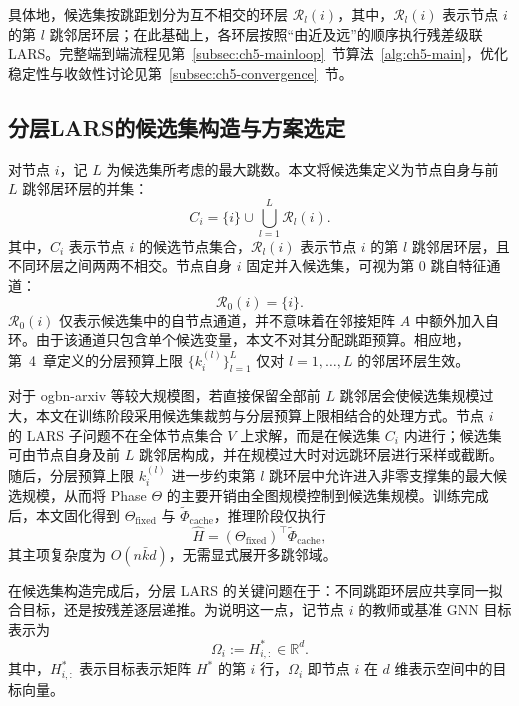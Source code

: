 具体地，候选集按跳距划分为互不相交的环层 $\mathcal{R}_l(i)$，其中，$\mathcal{R}_l(i)$ 表示节点 $i$ 的第 $l$ 跳邻居环层；在此基础上，各环层按照“由近及远”的顺序执行残差级联 LARS。完整端到端流程见第~\ref{subsec:ch5-mainloop}~节算法~\ref{alg:ch5-main}，优化稳定性与收敛性讨论见第~\ref{subsec:ch5-convergence}~节。

\subsection{分层LARS的候选集构造与方案选定}
\label{subsec:ch5-candidateset}

对节点 \(i\)，记 \(L\) 为候选集所考虑的最大跳数。本文将候选集定义为节点自身与前 \(L\) 跳邻居环层的并集：
\begin{equation}
  C_i=\{i\}\cup\bigcup_{l=1}^{L}\mathcal{R}_l(i).
  \label{eq:ch5-candidate-set}
\end{equation}
其中，\(C_i\) 表示节点 \(i\) 的候选节点集合，\(\mathcal{R}_l(i)\) 表示节点 \(i\) 的第 \(l\) 跳邻居环层，且不同环层之间两两不相交。节点自身 \(i\) 固定并入候选集，可视为第 \(0\) 跳自特征通道：
\begin{equation}
  \mathcal{R}_0(i)=\{i\}.
  \label{eq:ch5-self-ring}
\end{equation}
\(\mathcal{R}_0(i)\) 仅表示候选集中的自节点通道，并不意味着在邻接矩阵 \(A\) 中额外加入自环。由于该通道只包含单个候选变量，本文不对其分配跳距预算。相应地，第~4~章定义的分层预算上限 \(\{k_i^{(l)}\}_{l=1}^{L}\) 仅对 \(l=1,\ldots,L\) 的邻居环层生效。

对于 ogbn-arxiv 等较大规模图，若直接保留全部前 \(L\) 跳邻居会使候选集规模过大，本文在训练阶段采用候选集裁剪与分层预算上限相结合的处理方式。节点 \(i\) 的 LARS 子问题不在全体节点集合 \(V\) 上求解，而是在候选集 \(C_i\) 内进行；候选集可由节点自身及前 \(L\) 跳邻居构成，并在规模过大时对远跳环层进行采样或截断。随后，分层预算上限 \(k_i^{(l)}\) 进一步约束第 \(l\) 跳环层中允许进入非零支撑集的最大候选规模，从而将 Phase \(\Theta\) 的主要开销由全图规模控制到候选集规模。训练完成后，本文固化得到 \(\Theta_{\mathrm{fixed}}\) 与 \(\tilde{\Phi}_{\mathrm{cache}}\)，推理阶段仅执行
\begin{equation}
  \hat{H}=(\Theta_{\mathrm{fixed}})^\top\tilde{\Phi}_{\mathrm{cache}},
  \label{eq:ch5-fixed-inference}
\end{equation}
其主项复杂度为 \(O(n\bar{k}d)\)，无需显式展开多跳邻域。

在候选集构造完成后，分层 LARS 的关键问题在于：不同跳距环层应共享同一拟合目标，还是按残差逐层递推。为说明这一点，记节点 \(i\) 的教师或基准 GNN 目标表示为
\begin{equation}
  \Omega_i := H_{i,:}^{*}\in\mathbb{R}^{d}.
  \label{eq:ch5-target-vector}
\end{equation}
其中，\(H_{i,:}^{*}\) 表示目标表示矩阵 \(H^{*}\) 的第 \(i\) 行，\(\Omega_i\) 即节点 \(i\) 在 \(d\) 维表示空间中的目标向量。

